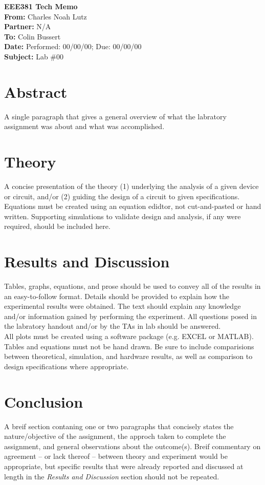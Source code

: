 \documentclass[11pt]{article}
\begin{document}
	{\Huge\textbf{EEE381 Tech Memo}}\\
	\hfill \break
	\textbf{From:} Charles Noah Lutz\\
	\textbf{Partner:} N/A\\
	\textbf{To:} Colin Bussert\\
	\textbf{Date:} Performed: 00/00/00; Due: 00/00/00\\
	\textbf{Subject:} Lab \#00

	\section{Abstract}
	A single paragraph that gives a general overview of what the labratory 
	assignment was about and what was accomplished.
	
	\section{Theory}
	A concise presentation of the theory (1) underlying the analysis of a given
	device or circuit, and/or (2) guiding the design of a circuit to given 
	specifications. Equations must be created using an equation edidtor, not
	cut-and-pasted or hand written. Supporting simulations to validate design
	and analysis, if any were required, should be included here.

	\section{Results and Discussion}
	Tables, graphs, equations, and prose should be used to convey all of the
	results in an easy-to-follow format. Details should be provided to 
	explain how the experimental results were obtained. The text should 
	explain any knowledge and/or information gained by performing the experiment.
	All questions posed in the labratory handout and/or by the TAs in lab should
	be answered.\\
	\hfill \break
	All plots must be created using a software package (e.g. EXCEL or MATLAB).
	Tables and equations must not be hand drawn. Be sure to include comparisions
	between theoretical, simulation, and hardware results, as well as
	comparison to design specifications where appropriate.

	\section{Conclusion}
	A breif section contaning one or two paragraphs that concisely states the
	nature/objective of the assignment, the approch taken to complete the
	assignment, and general observations about the outcome(s). Breif commentary
	on agreement -- or lack thereof -- between theory and experiment would be 
	appropriate, but specific results that were already reported and discussed
	at length in the \textit{Results and Discussion} section should not be 
	repeated.
\end{document}
